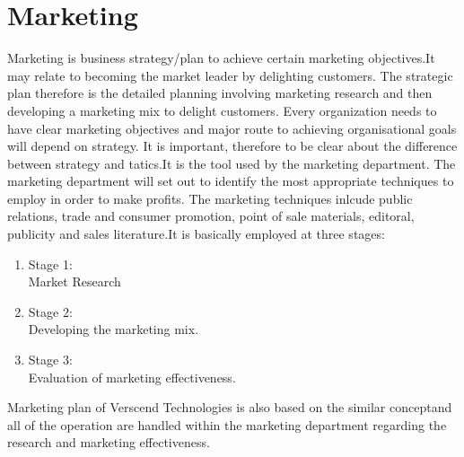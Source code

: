 \section{Marketing}
Marketing is business strategy/plan to achieve certain marketing objectives.It may relate to becoming the market leader by delighting customers. The strategic plan therefore is the detailed planning involving marketing research and then developing a marketing mix to delight customers. Every organization needs to have clear marketing objectives and major route to achieving organisational goals will depend on strategy. It is important, therefore to be clear about the difference between strategy and tatics.It is the tool used by the marketing department. The marketing department will set out to identify the most appropriate techniques to employ in order to make profits. The marketing techniques inlcude public relations, trade and consumer promotion, point of sale materials, editoral, publicity and sales literature.It is basically employed at three stages:
\begin{enumerate}
\item Stage 1:\\
Market Research
\item Stage 2:\\
Developing the marketing mix.
\item Stage 3: \\
Evaluation of marketing effectiveness.
\end{enumerate}
Marketing plan of Verscend Technologies is also based on the similar conceptand all of the operation are handled within the marketing department regarding the research and marketing effectiveness.
\cleardoublepage


